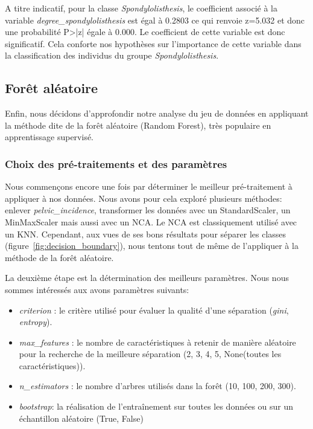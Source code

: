 \documentclass[twocolumn,10pt]{article}
\begin{document}
A titre indicatif, pour la classe \textit{Spondylolisthesis}, le coefficient associé à la variable \textit{degree\_spondylolisthesis} est égal à 0.2803 ce qui renvoie z=5.032 et donc une probabilité P>|z| égale à 0.000. Le coefficient de cette variable est donc significatif. Cela conforte nos hypothèses sur l'importance de cette variable dans la classification des individus du groupe \textit{Spondylolisthesis}.


\subsection{Forêt aléatoire}

Enfin, nous décidons d'approfondir notre analyse du jeu de données en appliquant la méthode dite de la forêt aléatoire (Random Forest), très populaire en apprentissage supervisé.

\subsubsection{Choix des pré-traitements et des paramètres }
Nous commençons encore une fois par déterminer le meilleur pré-traitement à appliquer à nos données.
Nous avons pour cela exploré plusieurs méthodes: enlever \textit{pelvic\_incidence}, transformer les données avec un StandardScaler, un MinMaxScaler mais aussi avec un NCA.
Le NCA est classiquement utilisé avec un KNN. Cependant, aux vues de ses bons résultats pour séparer les classes (figure~\ref{fig:decision_boundary}), nous tentons tout de même de l'appliquer à la méthode de la forêt aléatoire.

La deuxième étape est la détermination des meilleurs paramètres. Nous nous sommes intéressés aux avons paramètres suivants:
\begin{itemize}
    \item \textit{criterion} : le critère utilisé pour évaluer la qualité d’une séparation (\textit{gini}, \textit{entropy}).
    \item \textit{max\_features} : le nombre de caractéristiques à retenir de manière aléatoire pour la recherche de la meilleure séparation (2, 3, 4, 5, None(toutes les caractéristiques)).
    \item \textit{n\_estimators} : le nombre d’arbres utilisés dans la forêt (10, 100, 200, 300).
    \item \textit{bootstrap}: la réalisation de l’entraînement sur toutes les données ou sur un échantillon aléatoire (True, False)
\end{itemize}
\end{document}
